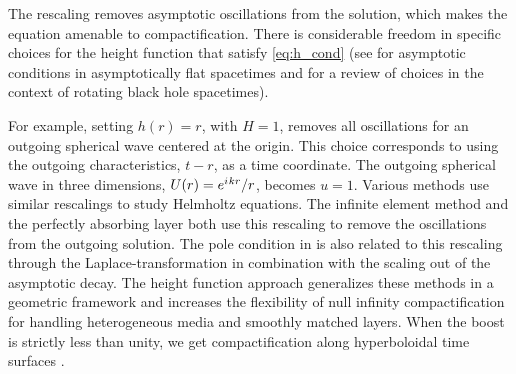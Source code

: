 \documentclass[final,onefignum,onetabnum]{siamart190516}
\newcommand{\iu}{{i\mkern1mu}}
\begin{document}
The rescaling removes asymptotic oscillations from the solution, which makes the equation amenable to compactification. There is considerable freedom in specific choices for the height function that satisfy \eqref{eq:h_cond} (see \cite{Zenginoglu08} for asymptotic conditions in asymptotically flat spacetimes and \cite{Macedo_2020} for a review of choices in the context of rotating black hole spacetimes). 

For example, setting $h(r)=r$, with $H=1$, removes all oscillations for an outgoing spherical wave centered at the origin. This choice corresponds to using the outgoing characteristics, $t-r$, as a time coordinate. The outgoing spherical wave in three dimensions, $U(r)=e^{\iu k r}/r$, becomes $u=1$. Various methods use similar rescalings to study Helmholtz equations. The infinite element method \cite{demkowicz2006few} and the perfectly absorbing layer \cite{wang2017perfect, yang2021truly} both use this rescaling to remove the oscillations from the outgoing solution. The pole condition in \cite{schmidt2008pole} is also related to this rescaling through the Laplace-transformation in combination with the scaling out of the asymptotic decay. The height function approach generalizes these methods in a geometric framework and increases the flexibility of null infinity compactification for handling heterogeneous media and smoothly matched layers. When the boost is strictly less than unity, we get compactification along hyperboloidal time surfaces \cite{Zenginoglu08}. 
\end{document}
